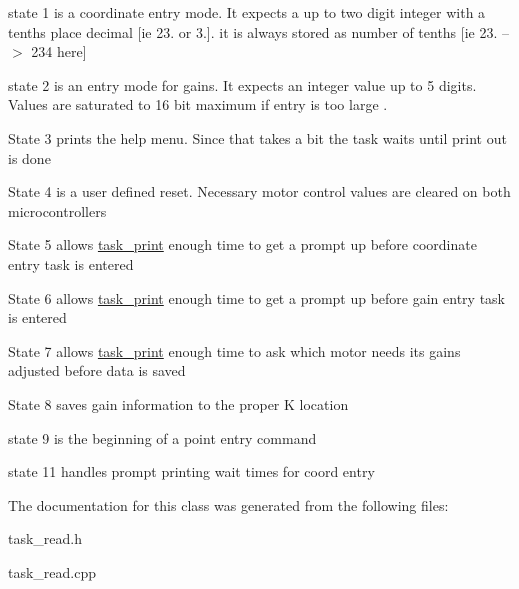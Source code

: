 state 1 is a coordinate entry mode. It expects a up to two digit integer with a tenths place decimal \mbox{[}ie 23. or 3.\mbox{]}. it is always stored as number of tenths \mbox{[}ie 23. --$>$ 234 here\mbox{]}

state 2 is an entry mode for gains. It expects an integer value up to 5 digits. Values are saturated to 16 bit maximum if entry is too large .

State 3 prints the help menu. Since that takes a bit the task waits until print out is done

State 4 is a user defined reset. Necessary motor control values are cleared on both microcontrollers

State 5 allows \hyperlink{classtask__print}{task\-\_\-print} enough time to get a prompt up before coordinate entry task is entered

State 6 allows \hyperlink{classtask__print}{task\-\_\-print} enough time to get a prompt up before gain entry task is entered

State 7 allows \hyperlink{classtask__print}{task\-\_\-print} enough time to ask which motor needs its gains adjusted before data is saved

State 8 saves gain information to the proper K location

state 9 is the beginning of a point entry command

state 11 handles prompt printing wait times for coord entry 

The documentation for this class was generated from the following files\-:\begin{DoxyCompactItemize}
\item 
task\-\_\-read.\-h\item 
task\-\_\-read.\-cpp\end{DoxyCompactItemize}
